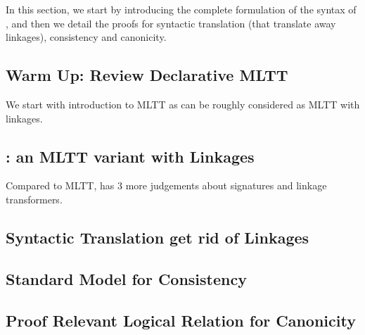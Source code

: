 In this section, we start by introducing the complete formulation of the syntax of \TT, 
and then we detail the proofs for syntactic translation (that translate away linkages), 
consistency and canonicity.

\subsection{Warm Up: Review Declarative MLTT}
We start with introduction to MLTT as \TT can be roughly considered as MLTT with linkages.



\subsection{\TT : an MLTT variant with Linkages}
Compared to MLTT, \TT has 3 more judgements about signatures and linkage transformers.








\subsection{Syntactic Translation get rid of Linkages}



\subsection{Standard Model for Consistency}




\subsection{Proof Relevant Logical Relation for Canonicity}

